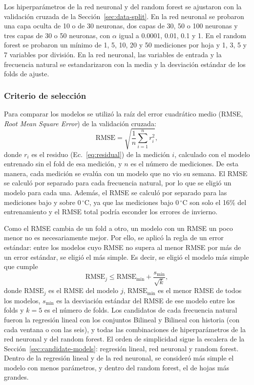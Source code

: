 \documentclass[9pt,twocolumn,twoside]{opticajnl}
\begin{document}
Los hiperparámetros de la red neuronal y del random forest se ajustaron con la validación cruzada de la Sección~\ref{sec:data-split}. En la red neuronal se probaron una capa oculta de 10 o de 30 neuronas, dos capas de 30, 50 o 100 neuronas y tres capas de 30 o 50 neuronas, con $\alpha$ igual a 0.0001, 0.01, 0.1 y 1. En el random forest se probaron un mínimo de 1, 5, 10, 20 y 50 mediciones por hoja y 1, 3, 5 y 7 variables por división. En la red neuronal, las variables de entrada y la frecuencia natural se estandarizaron con la media y la desviación estándar de los folds de ajuste.

\subsubsection{Criterio de selección}
\label{sec:selection-criterion}

Para comparar los modelos se utilizó la raíz del error cuadrático medio (RMSE, \emph{Root Mean Square Error}) de la validación cruzada:
\begin{equation}
\text{RMSE} = \sqrt{\frac{1}{n} \sum_{i=1}^{n} r_i^2},
\label{eq:rmse}
\end{equation}
donde $r_i$ es el residuo (Ec.~\eqref{eq:residual}) de la medición $i$, calculado con el modelo entrenado sin el fold de esa medición, y $n$ es el número de mediciones. De esta manera, cada medición se evalúa con un modelo que no vio su semana. El RMSE se calculó por separado para cada frecuencia natural, por lo que se eligió un modelo para cada una. Además, el RMSE se calculó por separado para las mediciones bajo y sobre $0\,^\circ$C, ya que las mediciones bajo $0\,^\circ$C son solo el 16\% del entrenamiento y el RMSE total podría esconder los errores de invierno.

Como el RMSE cambia de un fold a otro, un modelo con un RMSE un poco menor no es necesariamente mejor. Por ello, se aplicó la regla de un error estándar: entre los modelos cuyo RMSE no supera al menor RMSE por más de un error estándar, se eligió el más simple. Es decir, se eligió el modelo más simple que cumple
\begin{equation}
\text{RMSE}_j \le \text{RMSE}_{\min} + \frac{s_{\min}}{\sqrt{k}},
\label{eq:one-se}
\end{equation}
donde $\text{RMSE}_j$ es el RMSE del modelo $j$, $\text{RMSE}_{\min}$ es el menor RMSE de todos los modelos, $s_{\min}$ es la desviación estándar del RMSE de ese modelo entre los folds y $k = 5$ es el número de folds. Los candidatos de cada frecuencia natural fueron la regresión lineal con los conjuntos Bilineal y Bilineal con historia (con cada ventana o con las seis), y todas las combinaciones de hiperparámetros de la red neuronal y del random forest. El orden de simplicidad sigue la escalera de la Sección~\ref{sec:candidate-models}: regresión lineal, red neuronal y random forest. Dentro de la regresión lineal y de la red neuronal, se consideró más simple el modelo con menos parámetros, y dentro del random forest, el de hojas más grandes.
\end{document}
